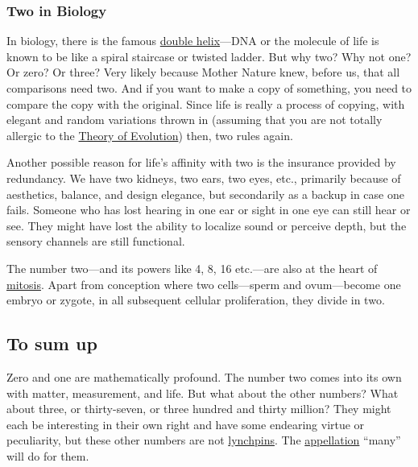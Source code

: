 \documentclass[
  a4paper,
]{article}
\begin{document}
\hypertarget{two-in-biology}{%
\subsubsection{Two in Biology}\label{two-in-biology}}

In biology, there is the famous
\href{https://www.genome.gov/genetics-glossary/Double-Helix}{double
helix}---DNA or the molecule of life is known to be like a spiral
staircase or twisted ladder. But why two? Why not one? Or zero? Or
three? Very likely because Mother Nature knew, before us, that all
comparisons need two. And if you want to make a copy of something, you
need to compare the copy with the original. Since life is really a
process of copying, with elegant and random variations thrown in
(assuming that you are not totally allergic to the
\href{https://www.livescience.com/474-controversy-evolution-works.html}{Theory
of Evolution}) then, two rules again.

Another possible reason for life's affinity with two is the insurance
provided by redundancy. We have two kidneys, two ears, two eyes, etc.,
primarily because of aesthetics, balance, and design elegance, but
secondarily as a backup in case one fails. Someone who has lost hearing
in one ear or sight in one eye can still hear or see. They might have
lost the ability to localize sound or perceive depth, but the sensory
channels are still functional.

The number two---and its powers like 4, 8, 16 etc.---are also at the
heart of
\href{https://www.nature.com/scitable/definition/mitosis-cell-division-47/}{mitosis}.
Apart from conception where two cells---sperm and ovum---become one
embryo or zygote, in all subsequent cellular proliferation, they divide
in two.

\hypertarget{to-sum-up}{%
\subsection{To sum up}\label{to-sum-up}}

Zero and one are mathematically profound. The number two comes into its
own with matter, measurement, and life. But what about the other
numbers? What about three, or thirty-seven, or three hundred and thirty
million? They might each be interesting in their own right and have some
endearing virtue or peculiarity, but these other numbers are not
\href{https://www.thefreedictionary.com/lynchpin}{lynchpins}. The
\href{https://www.dictionary.com/browse/appellation}{appellation}
``many'' will do for them.
\end{document}

